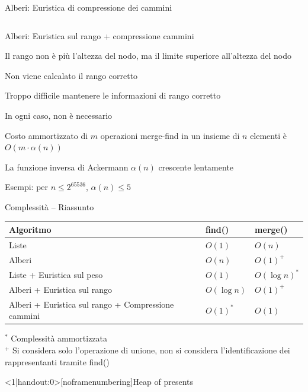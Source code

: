 \begin{frame}{Alberi: Euristica di compressione dei cammini}
\begin{columns}[T]
\end{columns}
\end{frame}


\begin{frame}{Alberi: Euristica sul rango + compressione cammini}

\vspace{-9pt}
\begin{myboxtitle}
\BIL
\item Il rango non è più l'altezza del nodo, ma il \alert{limite superiore} all'altezza del nodo
\item \alert{Non} viene calcalato il rango corretto
\BI
\item Troppo difficile mantenere le informazioni di rango corretto
\item In ogni caso, non è necessario
\EI
\EIL
\end{myboxtitle}

\begin{myboxtitle}[Complessità]
\BIL 
\item Costo ammortizzato di $m$ operazioni merge-find in un insieme di $n$
elementi è $O(m \cdot \alpha(n))$
\item  La \alert{funzione inversa di Ackermann $\alpha(n)$} crescente lentamente
\item Esempi: per $n \leq 2^{65536}$, $\alpha(n) \leq 5$
\EIL
\end{myboxtitle}

\end{frame}

\begin{frame}{Complessità -- Riassunto}

\begin{tabular}{|P{6cm}|l|l|}
\hline
\textbf{Algoritmo} & \textsf{find}() & \textsf{merge}() \\\hline
Liste  & $O(1)$ & $O(n)$ \\\hline
Alberi & $O(n)$ & $O(1)^+$ \\\hline
Liste + Euristica sul peso & $O(1)$ & $O(\log n)^*$ \\\hline
Alberi + Euristica sul rango & $O(\log n)$ & $O(1)^+$ \\\hline
Alberi + Euristica sul rango +
Compressione cammini & $O(1)^*$ & $O(1)$ \\\hline
\end{tabular}

\bigskip
$^*$ Complessità ammortizzata\\
$^+$ Si considera solo l'operazione di unione, non si considera l'identificazione dei rappresentanti tramite \textsf{find}()

\end{frame}

\begin{frame}<1|handout:0>[noframenumbering]{Heap of presents}


\end{frame}



